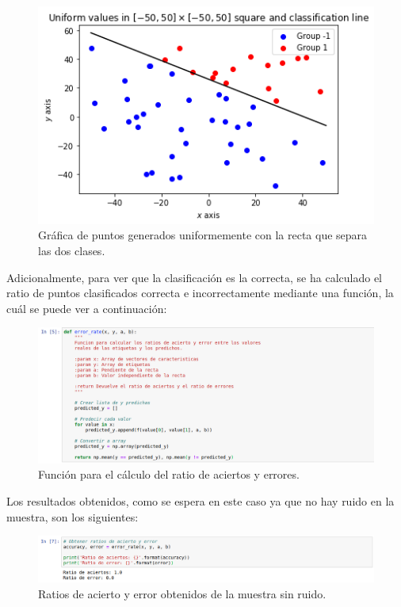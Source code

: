 \documentclass[11pt,a4paper]{article}
\begin{document}
\begin{figure}[H]
\centering
\includegraphics[scale=0.6]{img/data_line_no_noise.png}
\caption{Gráfica de puntos generados uniformemente con la recta que separa las dos clases.}
\end{figure}

Adicionalmente, para ver que la clasificación es la correcta, se ha calculado el ratio de puntos
clasificados correcta e incorrectamente mediante una función, la cuál se puede ver a continuación:

\begin{figure}[H]
\centering
\includegraphics[scale=0.4]{img/error_rate.png}
\caption{Función para el cálculo del ratio de aciertos y errores.}
\end{figure}

Los resultados obtenidos, como se espera en este caso ya que no hay ruido en la muestra, son los
siguientes:

\begin{figure}[H]
\centering
\includegraphics[scale=0.4]{img/error_no_noise.png}
\caption{Ratios de acierto y error obtenidos de la muestra sin ruido.}
\end{figure}
\end{document}
